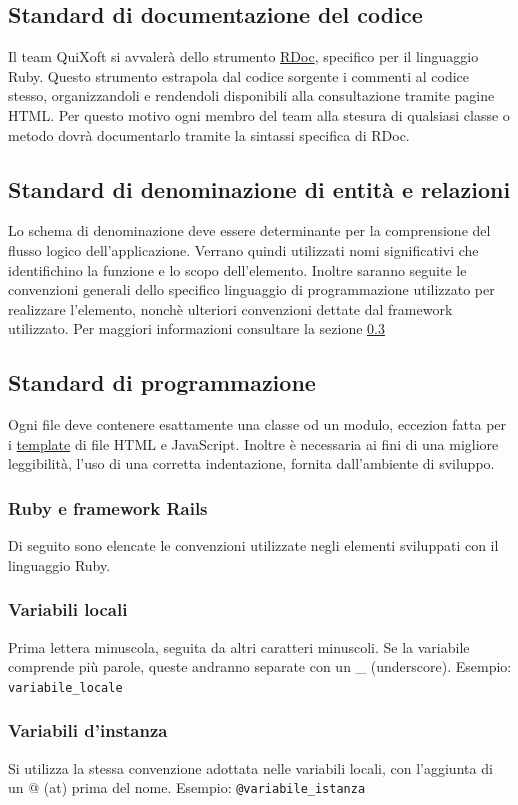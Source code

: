 \documentclass[11pt,a4paper]{article}
\begin{document}
\subsection{Standard di documentazione del codice}
Il team QuiXoft si avvalerà dello strumento \underline{RDoc}, specifico per il linguaggio Ruby. Questo strumento estrapola dal codice sorgente i commenti al codice stesso, organizzandoli e rendendoli disponibili alla consultazione tramite pagine HTML. Per questo motivo ogni membro del team alla stesura di qualsiasi classe o metodo dovrà documentarlo tramite la sintassi specifica di RDoc.

\subsection{Standard di denominazione di entità e relazioni}
Lo schema di denominazione deve essere determinante per la comprensione del flusso logico dell'applicazione. Verrano quindi utilizzati nomi significativi che identifichino la funzione e lo scopo dell'elemento. Inoltre saranno seguite le convenzioni generali dello specifico linguaggio di programmazione utilizzato per realizzare l'elemento, nonchè ulteriori convenzioni dettate dal framework utilizzato. Per maggiori informazioni consultare la sezione \ref{programmazione}

\subsection{Standard di programmazione}\label{programmazione}
Ogni file deve contenere esattamente una classe od un modulo, eccezion fatta per i \underline{template} di file HTML e JavaScript. Inoltre è necessaria ai fini di una migliore leggibilità, l'uso di una corretta indentazione, fornita dall'ambiente di sviluppo. 
\subsubsection{Ruby e framework Rails}
Di seguito sono elencate le convenzioni utilizzate negli elementi sviluppati con il linguaggio Ruby.
\subsubsection*{Variabili locali}
Prima lettera minuscola, seguita da altri caratteri minuscoli. Se la variabile comprende più parole, queste andranno separate con un \_ (underscore). Esempio: \verb|variabile_locale|
\subsubsection*{Variabili d'instanza}
Si utilizza la stessa convenzione adottata nelle variabili locali, con l'aggiunta di un @ (at) prima del nome. Esempio: \verb|@variabile_istanza|
\end{document}
